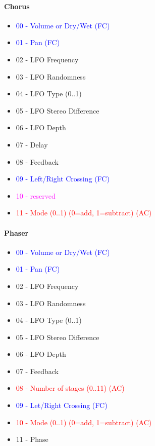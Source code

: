 \paragraph{Chorus}

   \begin{itemize}
      \item \textcolor{blue}{00 - Volume or Dry/Wet (FC)}
      \item \textcolor{blue}{01 - Pan (FC)}
      \item 02 - LFO Frequency
      \item 03 - LFO Randomness
      \item 04 - LFO Type (0..1)
      \item 05 - LFO Stereo Difference
      \item 06 - LFO Depth
      \item 07 - Delay
      \item 08 - Feedback
      \item \textcolor{blue}{09 - Left/Right Crossing (FC)}
      \item \textcolor{magenta}{10 - reserved}
      \item \textcolor{red}{11 - Mode (0..1) (0=add, 1=subtract) (AC)}
   \end{itemize}

\paragraph{Phaser}

   \begin{itemize}
      \item \textcolor{blue}{00 - Volume or Dry/Wet (FC)}
      \item \textcolor{blue}{01 - Pan (FC)}
      \item 02 - LFO Frequency
      \item 03 - LFO Randomness
      \item 04 - LFO Type (0..1)
      \item 05 - LFO Stereo Difference
      \item 06 - LFO Depth
      \item 07 - Feedback
      \item \textcolor{red}{08 - Number of stages (0..11) (AC)}
      \item \textcolor{blue}{09 - Let/Right Crossing (FC)}
      \item \textcolor{red}{10 - Mode (0..1) (0=add, 1=subtract) (AC)}
      \item 11 - Phase
   \end{itemize}

